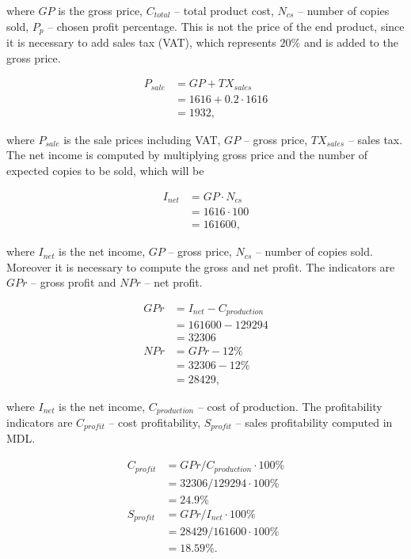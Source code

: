 \noindent
where $GP$ is the gross price, $C_{total}$ -- total product cost, $N_{cs}$ -- number of copies sold, $P_{p}$ -- chosen profit percentage. This is not the price of the end product, since it is necessary to add sales tax (VAT), which represents $20\%$ and is added to the gross price. 

\begin{equation}
\begin{split}
P_{sale} &= GP + TX_{sales}\\
&= 1616 + 0.2 \cdot 1616 \\
&= 1932,
\end{split}
\end{equation}

\noindent
where $P_{sale}$ is the sale prices including VAT, $GP$ -- gross price, $TX_{sales}$ -- sales tax. The net income is computed by multiplying gross price and the number of expected copies to be sold, which will be

\begin{equation}
\begin{split}
I_{net} &= GP \cdot N_{cs}\\
&= 1616  \cdot 100 \\
&= 161600,
\end{split}
\end{equation}

\noindent
where $I_{net}$ is the net income, $GP$ -- gross price, $N_{cs}$ -- number of copies sold. Moreover it is necessary to compute the gross and net profit. The indicators are $GPr$ -- gross profit and $NPr$ -- net profit.

\begin{equation}
\begin{split}
GPr &= I_{net} - C_{production}\\
&= 161600 - 129294\\
&= 32306\\
NPr &= GPr - 12\% \\
&= 32306 - 12\% \\
&= 28429,
\end{split}
\end{equation}

\noindent
where $I_{net}$ is the net income, $C_{production}$ -- cost of production. The profitability indicators are $C_{profit}$ -- cost profitability, $S_{profit}$ -- sales profitability computed in MDL.

\begin{equation}
\begin{split}
C_{profit} &= GPr / C_{production} \cdot 100\%\\
&= 32306 / 129294 \cdot 100\% \\
&= 24.9 \%\\
S_{profit} &= GPr / I_{net} \cdot 100\% \\
&= 28429 / 161600 \cdot 100\% \\
&= 18.59 \%.
\end{split}
\end{equation}
